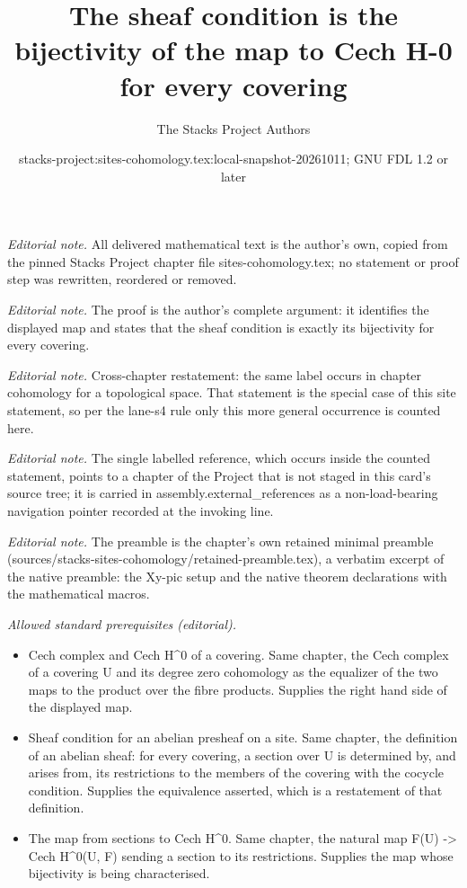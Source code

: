 \documentclass[10pt,a4paper]{amsart}
\title{The sheaf condition is the bijectivity of the map to Cech H-0 for every covering}
\author{The Stacks Project Authors}
\date{stacks-project:sites-cohomology.tex:local-snapshot-20261011; GNU FDL 1.2 or later}
\theoremstyle{plain}
\theoremstyle{definition}
\theoremstyle{remark}
\numberwithin{equation}{subsection}
\begin{document}
\maketitle
\noindent\textit{Editorial note.} All delivered mathematical text is the author's own, copied from the pinned Stacks Project chapter file sites-cohomology.tex; no statement or proof step was rewritten, reordered or removed.\par\medskip
\noindent\textit{Editorial note.} The proof is the author's complete argument: it identifies the displayed map and states that the sheaf condition is exactly its bijectivity for every covering.\par\medskip
\noindent\textit{Editorial note.} Cross-chapter restatement: the same label occurs in chapter cohomology for a topological space. That statement is the special case of this site statement, so per the lane-s4 rule only this more general occurrence is counted here.\par\medskip
\noindent\textit{Editorial note.} The single labelled reference, which occurs inside the counted statement, points to a chapter of the Project that is not staged in this card's source tree; it is carried in assembly.external\_references as a non-load-bearing navigation pointer recorded at the invoking line.\par\medskip
\noindent\textit{Editorial note.} The preamble is the chapter's own retained minimal preamble (sources/stacks-sites-cohomology/retained-preamble.tex), a verbatim excerpt of the native preamble: the Xy-pic setup and the native theorem declarations with the mathematical macros.\par\medskip
\noindent\textit{Allowed standard prerequisites (editorial).}\begin{itemize}
\item Cech complex and Cech H\textasciicircum{}0 of a covering. Same chapter, the Cech complex of a covering U and its degree zero cohomology as the equalizer of the two maps to the product over the fibre products. Supplies the right hand side of the displayed map.
\item Sheaf condition for an abelian presheaf on a site. Same chapter, the definition of an abelian sheaf: for every covering, a section over U is determined by, and arises from, its restrictions to the members of the covering with the cocycle condition. Supplies the equivalence asserted, which is a restatement of that definition.
\item The map from sections to Cech H\textasciicircum{}0. Same chapter, the natural map F(U) -> Cech H\textasciicircum{}0(U, F) sending a section to its restrictions. Supplies the map whose bijectivity is being characterised.
\end{itemize}\medskip
\end{document}

